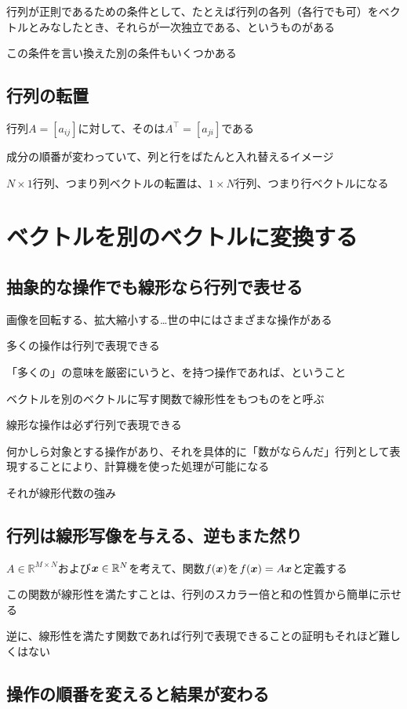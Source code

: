 \documentclass[../book_half_step_linear]{subfiles}
\begin{document}
\br

行列が正則であるための条件として、たとえば行列の各列（各行でも可）をベクトルとみなしたとき、それらが一次独立である、というものがある

この条件を言い換えた別の条件もいくつかある

\sectionline
\subsection{行列の転置}

行列$A=[a_{ij}]$に対して、そのは$A^\top=[a_{ji}]$である

成分の順番が変わっていて、列と行をばたんと入れ替えるイメージ

\br

$N\times 1$行列、つまり列ベクトルの転置は、$1\times N$行列、つまり行ベクトルになる

\section{ベクトルを別のベクトルに変換する}

\subsection{抽象的な操作でも線形なら行列で表せる}

画像を回転する、拡大縮小する…世の中にはさまざまな操作がある

多くの操作は行列で表現できる

「多くの」の意味を厳密にいうと、を持つ操作であれば、ということ

\br

ベクトルを別のベクトルに写す関数で線形性をもつものをと呼ぶ

線形な操作は必ず行列で表現できる

\br

何かしら対象とする操作があり、それを具体的に「数がならんだ」行列として表現することにより、計算機を使った処理が可能になる

それが線形代数の強み

\sectionline
\subsection{行列は線形写像を与える、逆もまた然り}

$A \in \mathbb{R}^{M \times N}$および$\vb*{x} \in \mathbb{R}^N$を考えて、関数$f(\vb*{x})$を$f(\vb*{x}) = A\vb*{x}$と定義する

この関数が線形性を満たすことは、行列のスカラー倍と和の性質から簡単に示せる

逆に、線形性を満たす関数であれば行列で表現できることの証明もそれほど難しくはない

\sectionline
\subsection{操作の順番を変えると結果が変わる}
\end{document}
